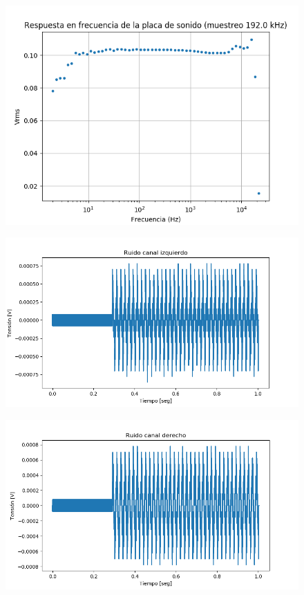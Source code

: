 \documentclass[a4paper,11pt]{article}
\begin{document}
	\begin{figure}[h]
		\centering
		\includegraphics[width=\textwidth]{imagenes/bode192kHz.png}
		\caption{}
	\end{figure}
	
	\begin{figure}[h]
		\centering
		\includegraphics[width=\textwidth]{imagenes/RuidoCanalIzquierdo.png}
		\caption{}
	\end{figure}
	
	\begin{figure}[h]
		\centering
		\includegraphics[width=\textwidth]{imagenes/RuidoCanalDerecho.png}
		\caption{}
	\end{figure}
\end{document}
